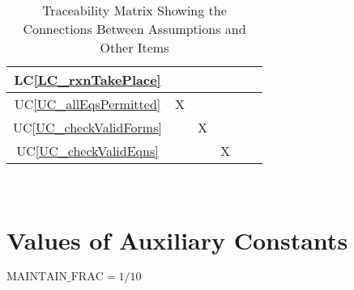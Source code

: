 \documentclass[12pt]{article}
\newcommand{\lcref}[1]{LC\ref{#1}}
\newcommand{\ucref}[1]{UC\ref{#1}}
\begin{document}
\begin{table}[h!]
{\begin{tabular}{|c|c|c|c|c|c|}
      \lcref{LC_rxnTakePlace}         &                       &                     &                    &                             &                      \\ \hline
      \ucref{UC_allEqsPermitted}      & X                     &                     &                    &                             &                      \\ \hline
      \ucref{UC_checkValidForms}      &                       & X                   &                    &                             &                      \\ \hline
      \ucref{UC_checkValidEqns}       &                       &                     & X                  &                             &                      \\ \hline
    \end{tabular}
    \caption{Traceability Matrix Showing the Connections Between Assumptions and Other Items}
    \label{Table:A_trace}
  }
\end{table}

\newpage



~\newpage

\section{Values of Auxiliary Constants}

$\text{MAINTAIN\_FRAC} = 1/10$

~\newpage
\end{document}
